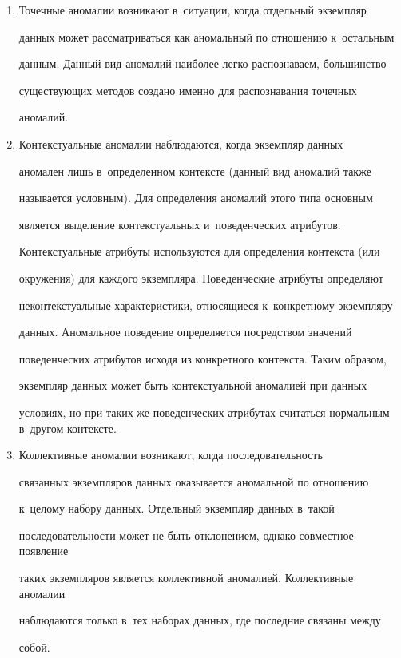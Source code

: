   \begin{enumerate}[1.]


  \item Точечные аномалии возникают в~ситуации, когда отдельный экземпляр 


данных может рассматриваться как аномальный по отношению к~остальным 


данным. Данный вид аномалий наиболее легко распознаваем, большинство 


существующих методов создано именно для распознавания точечных 


аномалий.


  \item Контекстуальные аномалии наблюдаются, когда экземпляр данных 


аномален лишь в~определенном контексте (данный вид аномалий так\-же 


называется условным). Для определения аномалий этого типа основным 


является выделение контекстуальных и~поведенческих атрибутов. 


Контекстуальные атрибуты используются для определения контекста (или 


окружения) для каж\-до\-го экземпляра. Поведенческие атрибуты определяют 


неконтекстуальные характеристики, относящиеся к~конкретному экземпляру 


данных. Аномальное поведение определяется посредством значений 


поведенческих атрибутов исходя из конкретного контекста. Таким образом, 


экземпляр данных может быть контекстуальной аномалией при данных 


условиях, но при таких же поведенческих атрибутах считаться нормальным в~другом контексте. 


  \item Коллективные аномалии возникают, когда последовательность 


связанных экземпляров данных оказывается аномальной по отношению 


к~целому набору данных. Отдельный экземпляр данных в~такой 


последовательности может не быть отклонением, однако совместное появление 


таких экземпляров является коллективной аномалией. Коллективные аномалии 


наблюдаются только в~тех наборах данных, где последние связаны между 


собой.


  \end{enumerate}


